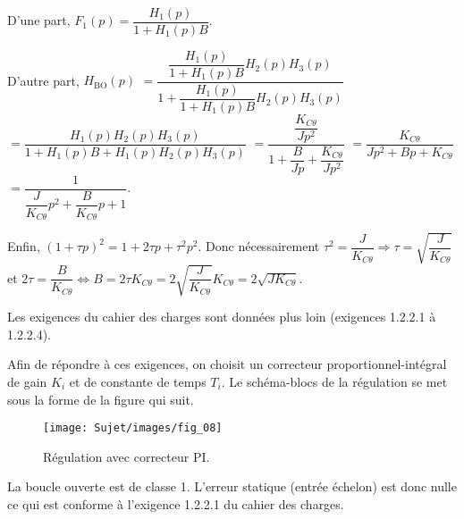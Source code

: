\ifprof
\begin{corrige}~\\

D'une part, $F_1(p)=\dfrac{H_1(p)}{1+H_1(p)B}$. 

D'autre part, 
$H_{\text{BO}}(p)$
$=\dfrac{\dfrac{H_1(p)}{1+H_1(p)B}H_2(p)H_3(p)}{1+\dfrac{H_1(p)}{1+H_1(p)B}H_2(p)H_3(p)}$ 
$=\dfrac{H_1(p)H_2(p)H_3(p)}{1+H_1(p)B+H_1(p)H_2(p)H_3(p)}$
$=\dfrac{\dfrac{K_{C\theta}}{Jp^2}}{1+\dfrac{B}{Jp}+\dfrac{K_{C\theta}}{Jp^2}}$
$=\dfrac{K_{C\theta}}{Jp^2+Bp+K_{C\theta}}$
$=\dfrac{1}{\dfrac{J}{K_{C\theta}}p^2+\dfrac{B}{K_{C\theta}}p+1}$.

Enfin, $\left(1+\tau p\right)^2 = 1+2\tau p + \tau^2p^2$. Donc nécessairement $\tau^2=\dfrac{J}{K_{C\theta}} \Rightarrow \tau=\sqrt{\dfrac{J}{K_{C\theta}}}$ et 
$2\tau = \dfrac{B}{K_{C\theta}} \Leftrightarrow B
=2\tau K_{C\theta}
=2\sqrt{\dfrac{J}{K_{C\theta}}} K_{C\theta}
=2\sqrt{JK_{C\theta}}$.
\end{corrige}
\else
\fi


\ifprof
\else
Les exigences du cahier des charges sont données plus loin (exigences 1.2.2.1 à 1.2.2.4).

Afin de répondre à ces exigences, on choisit un correcteur proportionnel-intégral de gain $K_i$ et de constante de temps $T_i$. Le schéma-blocs de la régulation se met sous la forme de la figure qui suit.

\begin{figure}[!h]
\centering
\texttt{[image: Sujet/images/fig\_08]}

\caption{Régulation avec correcteur PI.} 
\end{figure}
\fi

\ifprof
\begin{corrige}
La boucle ouverte est de classe 1. L'erreur statique (entrée échelon) est donc nulle ce qui est conforme à l'exigence 1.2.2.1 du cahier des charges. 
\end{corrige}
\else
\fi


